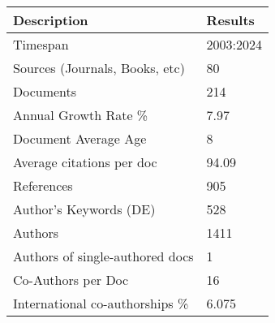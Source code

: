 
\begin{tabular}{ll}
\toprule
Description & Results\\
\midrule
Timespan & 2003:2024\\
Sources (Journals, Books, etc) & 80\\
Documents & 214\\
Annual Growth Rate \% & 7.97\\
Document Average Age & 8\\
\addlinespace
Average citations per doc & 94.09\\
References & 905\\
Author's Keywords (DE) & 528\\
Authors & 1411\\
Authors of single-authored docs & 1\\
\addlinespace
Co-Authors per Doc & 16\\
International co-authorships \% & 6.075\\
\bottomrule
\end{tabular}